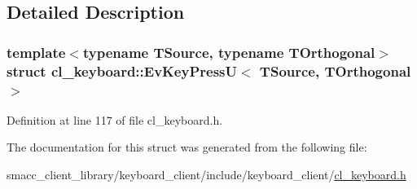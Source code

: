 \subsection{Detailed Description}
\subsubsection*{template$<$typename T\+Source, typename T\+Orthogonal$>$\newline
struct cl\+\_\+keyboard\+::\+Ev\+Key\+Press\+U$<$ T\+Source, T\+Orthogonal $>$}



Definition at line 117 of file cl\+\_\+keyboard.\+h.



The documentation for this struct was generated from the following file\+:\begin{DoxyCompactItemize}
\item 
smacc\+\_\+client\+\_\+library/keyboard\+\_\+client/include/keyboard\+\_\+client/\hyperlink{cl__keyboard_8h}{cl\+\_\+keyboard.\+h}\end{DoxyCompactItemize}
